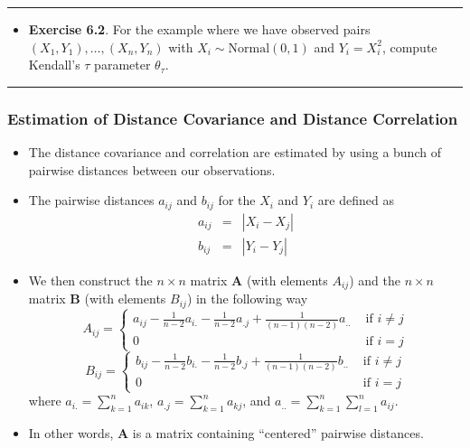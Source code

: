 \documentclass[]{book}
\providecommand{\tightlist}{%
  \setlength{\itemsep}{0pt}\setlength{\parskip}{0pt}}
\begin{document}
\begin{center}\rule{0.5\linewidth}{\linethickness}\end{center}

\begin{itemize}
\tightlist
\item
  \textbf{Exercise 6.2}. For the example where we have observed pairs \((X_{1}, Y_{1}), \ldots, (X_{n},Y_{n})\)
  with \(X_{i} \sim \textrm{Normal}(0, 1)\) and \(Y_{i} = X_{i}^{2}\), compute Kendall's \(\tau\) parameter \(\theta_{\tau}\).
\end{itemize}

\begin{center}\rule{0.5\linewidth}{\linethickness}\end{center}

\hypertarget{estimation-of-distance-covariance-and-distance-correlation}{%
\subsubsection{Estimation of Distance Covariance and Distance Correlation}\label{estimation-of-distance-covariance-and-distance-correlation}}

\begin{itemize}
\item
  The distance covariance and correlation are estimated by using a bunch of pairwise distances
  between our observations.
\item
  The pairwise distances \(a_{ij}\) and \(b_{ij}\) for the \(X_{i}\) and \(Y_{i}\) are defined as
  \begin{eqnarray}
  a_{ij} &=& | X_{i} - X_{j}|  \nonumber \\
  b_{ij} &=& | Y_{i} - Y_{j}|  \nonumber
  \end{eqnarray}
\item
  We then construct the \(n \times n\) matrix \(\mathbf{A}\)
  (with elements \(A_{ij}\)) and the \(n \times n\) matrix \(\mathbf{B}\)
  (with elements \(B_{ij}\)) in the following way
  \begin{equation}
  A_{ij} = 
  \begin{cases}
  a_{ij} - \frac{1}{n-2} a_{i.} - \frac{1}{n-2} a_{.j} + \frac{1}{(n-1)(n-2)}a_{..} & \textrm{ if } i \neq j \nonumber \\
  0 & \textrm{ if } i = j \nonumber
  \end{cases}
  \end{equation}
  \begin{equation}
  B_{ij} = 
  \begin{cases}
  b_{ij} - \frac{1}{n-2} b_{i.} - \frac{1}{n-2} b_{.j} + \frac{1}{(n-1)(n-2)}b_{..} & \textrm{ if } i \neq j \nonumber \\
  0 & \textrm{ if } i = j \nonumber
  \end{cases}
  \end{equation}
  where \(a_{i.} = \sum_{k=1}^{n} a_{ik}\), \(a_{.j} = \sum_{k=1}^{n} a_{kj}\), and \(a_{..} = \sum_{k=1}^{n}\sum_{l=1}^{n} a_{ij}\).
\item
  In other words, \(\mathbf{A}\) is a matrix containing ``centered'' pairwise distances.
\end{itemize}
\end{document}
